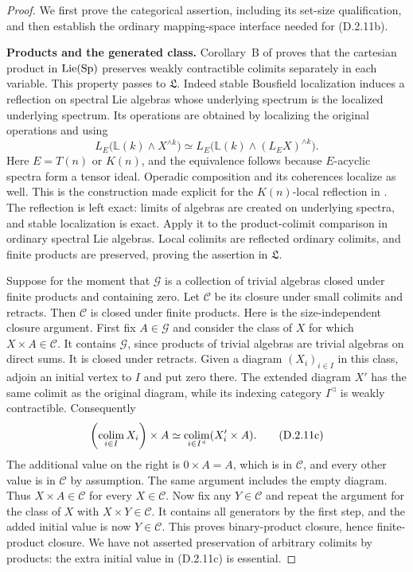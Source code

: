 \begin{proof}
We first prove the categorical assertion, including its set-size
qualification, and then establish the ordinary mapping-space
interface needed for \textup{(D.2.11b)}.

\medskip\noindent
\textbf{Products and the generated class.}
Corollary~B of \citet{I_BlansHeuts2026} proves that the cartesian
product in $\operatorname{Lie}(\mathrm{Sp})$ preserves weakly contractible
colimits separately in each variable. This property passes to
$\mathfrak L$. Indeed stable Bousfield localization induces a
reflection on spectral Lie algebras whose underlying spectrum is
the localized underlying spectrum. Its operations are obtained
by localizing the original operations and using
\[
 L_E\bigl(\mathbb L(k)\wedge X^{\wedge k}\bigr)
 \simeq
 L_E\bigl(\mathbb L(k)\wedge(L_EX)^{\wedge k}\bigr).
\]
Here $E=T(n)$ or $K(n)$, and the equivalence follows because
$E$-acyclic spectra form a tensor ideal. Operadic composition and
its coherences localize as well. This is the construction made
explicit for the $K(n)$-local reflection in
\cite[Proposition~4.26]{I_Heuts2021}.
The reflection is left exact: limits of algebras are created on
underlying spectra, and stable localization is exact. Apply it
to the product-colimit comparison in ordinary spectral Lie
algebras. Local colimits are reflected ordinary colimits, and
finite products are preserved, proving the assertion in
$\mathfrak L$.

Suppose for the moment that $\mathcal G$ is a collection of
trivial algebras closed under finite products and containing
zero. Let $\mathcal C$ be its closure under small colimits and
retracts. Then $\mathcal C$ is closed under finite products.
Here is the size-independent closure argument. First fix
$A\in\mathcal G$ and consider the class of $X$ for which
$X\times A\in\mathcal C$. It contains $\mathcal G$, since
products of trivial algebras are trivial algebras on direct sums.
It is closed under retracts. Given a diagram $(X_i)_{i\in I}$
in this class, adjoin an initial vertex to $I$ and put zero
there. The extended diagram $X'$ has the same colimit as the
original diagram, while its indexing category $I^{\triangleleft}$
is weakly contractible. Consequently
\[
 \left(\operatorname*{colim}_{i\in I}X_i\right)\times A
 \simeq
 \operatorname*{colim}_{i\in I^{\triangleleft}}(X'_i\times A).
 \tag{D.2.11c}
\]
The additional value on the right is $0\times A=A$, which is in
$\mathcal C$, and every other value is in $\mathcal C$ by
assumption. The same argument includes the empty diagram.
Thus $X\times A\in\mathcal C$ for every $X\in\mathcal C$.
Now fix any $Y\in\mathcal C$ and repeat the argument for the
class of $X$ with $X\times Y\in\mathcal C$. It contains all
generators by the first step, and the added initial value is
now $Y\in\mathcal C$. This proves binary-product closure, hence
finite-product closure. We have not asserted preservation of
arbitrary colimits by products: the extra initial value in
\textup{(D.2.11c)} is essential.


\end{proof}
